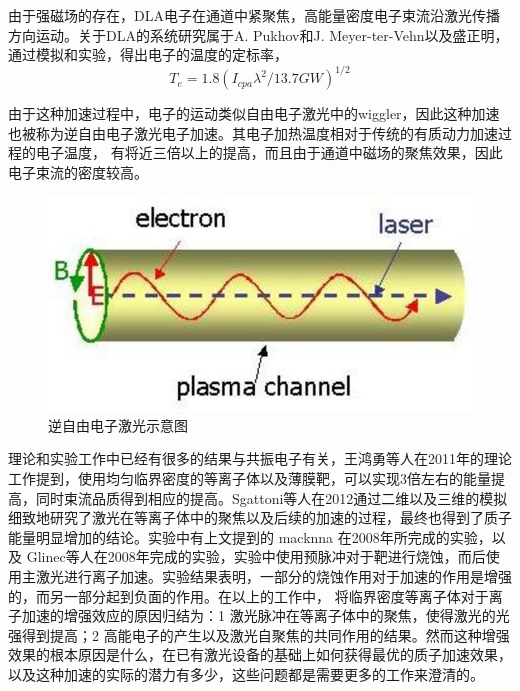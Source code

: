 由于强磁场的存在，DLA电子在通道中紧聚焦，高能量密度电子束流沿激光传播方向运动。关于DLA的系统研究属于A. Pukhov和J. Meyer-ter-Vehn以及盛正明\cite{pukhov1998relativistic,pukhov1999particle}，通过模拟和实验，得出电子的温度的定标率，
\begin{equation}
\label{eqn:DLAtemperature}
T_e = 1.8(I_{cpa} {\lambda}^2/{13.7}GW)^{1/2}
\end{equation} 



由于这种加速过程中，电子的运动类似自由电子激光中的wiggler，因此这种加速也被称为逆自由电子激光电子加速。其电子加热温度相对于传统的有质动力加速过程的电子温度， 有将近三倍以上的提高，而且由于通道中磁场的聚焦效果，因此电子束流的密度较高。
\begin{figure}[!htbp]
  \centering
  \includegraphics[width=\MyFactor\textwidth]{Img/IFEL.eps}
  \caption{逆自由电子激光示意图}
  \label{fig:IFEL}
\end{figure}









理论和实验工作中已经有很多的结果与共振电子有关，王鸿勇等人\cite{wang2011high}在2011年的理论工作提到，使用均匀临界密度的等离子体以及薄膜靶，可以实现3倍左右的能量提高，同时束流品质得到相应的提高。Sgattoni等人\cite{sgattoni2012laser}在2012通过二维以及三维的模拟细致地研究了激光在等离子体中的聚焦以及后续的加速的过程，最终也得到了质子能量明显增加的结论。实验中有上文提到的 macknna 在2008年所完成的实验，以及
Glinec等人\cite{glinec2008evolution}在2008年完成的实验，实验中使用预脉冲对于靶进行烧蚀，而后使用主激光进行离子加速。实验结果表明，一部分的烧蚀作用对于加速的作用是增强的，而另一部分起到负面的作用。在以上的工作中， 将临界密度等离子体对于离子加速的增强效应的原因归结为：1 激光脉冲在等离子体中的聚焦，使得激光的光强得到提高；2 高能电子的产生以及激光自聚焦的共同作用的结果。然而这种增强效果的根本原因是什么，在已有激光设备的基础上如何获得最优的质子加速效果，以及这种加速的实际的潜力有多少，这些问题都是需要更多的工作来澄清的。

